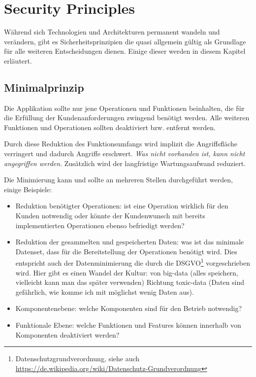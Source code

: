\chapter{Security Principles}

Während sich Technologien und Architekturen permanent wandeln und verändern, gibt es Sicherheitsprinzipien die quasi allgemein gültig als Grundlage für alle weiteren Entscheidungen dienen. Einige dieser werden in diesem Kapitel erläutert.

\section{Minimalprinzip}

Die Applikation sollte nur jene Operationen und Funktionen beinhalten, die für die Erfüllung der Kundenanforderungen zwingend benötigt werden. Alle weiteren Funktionen und Operationen sollten deaktiviert bzw. entfernt werden.

Durch diese Reduktion des Funktionsumfangs wird implizit die Angriffsfläche verringert und dadurch Angriffe erschwert. \textit{Was nicht vorhanden ist, kann nicht angegriffen werden}. Zusätzlich wird der langfristige Wartungsaufwand reduziert.

Die Minimierung kann und sollte an mehreren Stellen durchgeführt werden, einige Beispiele:

\begin{itemize}
	\item Reduktion benötigter Operationen: ist eine Operation wirklich für den Kunden notwendig oder könnte der Kundenwunsch mit bereits implementierten Operationen ebenso befriedigt werden?
	\item Reduktion der gesammelten und gespeicherten Daten: was ist das minimale Datenset, dass für die Bereitstellung der Operationen benötigt wird. Dies entspricht auch der Datenminimierung die durch die DSGVO\footnote{Datenschutzgrundverordnung, siehe auch \url{https://de.wikipedia.org/wiki/Datenschutz-Grundverordnung}} vorgeschrieben wird. Hier gibt es einen Wandel der Kultur: von big-data (alles speichern, vielleicht kann man das später verwenden) Richtung toxic-data (Daten sind gefährlich, wie komme ich mit möglichst wenig Daten aus).
	\item Komponentenebene: welche Komponenten sind für den Betrieb notwendig?
	\item Funktionale Ebene: welche Funktionen und Features können innerhalb von Komponenten deaktiviert werden?
\end{itemize}

